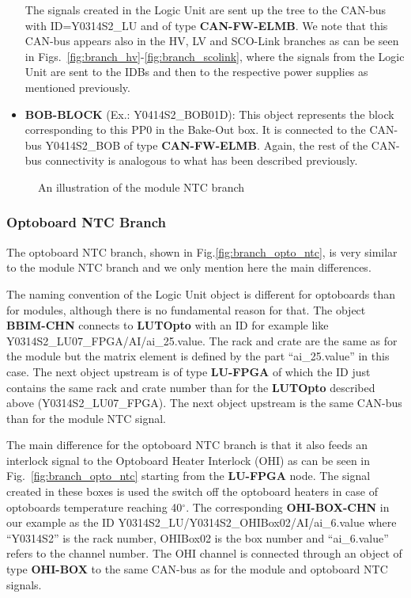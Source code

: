 \begin{itemize}
The signals created in the Logic Unit are sent up the tree to the CAN-bus with ID=Y0314S2\_LU and of type
{\bf CAN-FW-ELMB}. We note that this CAN-bus appears also in the HV, LV and SCO-Link branches as can be seen 
in Figs.~\ref{fig:branch_hv}-\ref{fig:branch_scolink}, where the signals from the Logic Unit are sent
to the IDBs and then to the respective power supplies as mentioned previously.

\item {\bf BOB-BLOCK} (Ex.: Y0414S2\_BOB01D): This object represents the block corresponding to this
PP0 in the Bake-Out box. It is connected to the CAN-bus   Y0414S2\_BOB of type {\bf CAN-FW-ELMB}.
Again, the rest of the CAN-bus connectivity is analogous to what has been described previously.
\end{itemize}

\begin{figure}
\begin{center}
\end{center}
\caption{An illustration of the module NTC branch}
\label{fig:branch_mod_ntc}
\end{figure}

\subsubsection{Optoboard NTC Branch}

The optoboard NTC branch, shown in Fig.\ref{fig:branch_opto_ntc}, is very similar to the module 
NTC branch and we only mention here the main differences.

The naming convention of the Logic Unit object is different for optoboards than for modules, 
although there is no fundamental reason for that. The object {\bf BBIM-CHN} connects to 
{\bf LUTOpto} with an ID for example like Y0314S2\_LU07\_FPGA/AI/ai\_25.value. The rack and crate 
are the same
as for the module but the matrix element is defined by the part ``ai\_25.value'' in this case.
The next object upstream is of type {\bf LU-FPGA} of which the ID just contains the same rack and 
crate number than for the {\bf LUTOpto} described above (Y0314S2\_LU07\_FPGA). 
The next object upstream is the same CAN-bus than for the module NTC signal.

The main difference for the optoboard NTC branch is that it also feeds an interlock
signal to the Optoboard Heater Interlock (OHI) as can be seen in Fig.~\ref{fig:branch_opto_ntc}
starting from the {\bf LU-FPGA} node.
The signal created in these boxes is used the switch off the optoboard heaters in case of 
optoboards temperature reaching 40$^\circ$.
The corresponding {\bf OHI-BOX-CHN} in our example as the ID Y0314S2\_LU/Y0314S2\_OHIBox02/AI/ai\_6.value
where ``Y0314S2'' is the rack number, OHIBox02 is the box number and ``ai\_6.value'' refers 
to the channel number. The OHI channel is connected through an object of type {\bf OHI-BOX} to 
the same CAN-bus as for the module and optoboard NTC signals.

